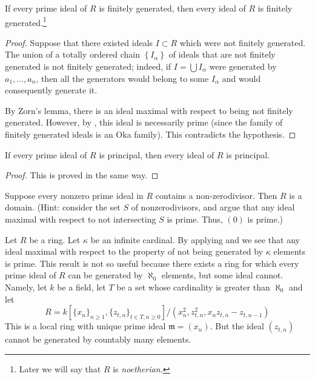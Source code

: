 \begin{corollary}[Cohen] \label{primenoetherian}
If every prime ideal of $R$ is finitely generated, then every ideal of $R$ is
finitely generated.\footnote{Later we will say that $R$ is \emph{noetherian.}} 
\end{corollary} 

\begin{proof} 
Suppose that there existed ideals $I \subset R$ which were not finitely
generated.
The union of a totally ordered chain $\left\{I_\alpha\right\}$ of ideals that
are not finitely generated is not finitely
generated; indeed, if $I = \bigcup I_\alpha$ were generated by $a_1, \dots,
a_n$, then all the generators would belong to some $I_\alpha $ and would
consequently generate it.

By Zorn's lemma, there is an ideal maximal with respect to being not finitely
generated. However, by , this ideal is necessarily
prime (since the family of finitely generated ideals is an Oka family). This contradicts the hypothesis.
\end{proof} 

\begin{corollary} 
If every prime ideal of $R$ is principal, then every ideal of $R$ is principal.
\end{corollary} 
\begin{proof} 
This is proved in the same way.
\end{proof} 

\begin{exercise} 
Suppose every nonzero prime ideal in $R$ contains a non-zerodivisor. Then $R$
is a domain. (Hint: consider the set $S$ of nonzerodivisors, and argue that
any ideal maximal with respect to not intersecting $S$ is prime. Thus, $(0)$
is prime.)
\end{exercise} 


\begin{remark}
\label{remark-cohen-bound-cardinality}
Let $R$ be a ring. Let $\kappa$ be an infinite cardinal.
By applying
 and
we see that any ideal maximal with respect to the property of not being
generated by $\kappa$ elements is prime. This result is not so
useful because there exists a ring for which every prime ideal
of $R$ can be generated by $\aleph_0$ elements, but some
ideal cannot. Namely, let $k$ be a field, let $T$ be a set whose
cardinality is greater than $\aleph_0$ and let
\[ R = k[\{x_n\}_{n \geq 1}, \{z_{t, n}\}_{t \in T, n \geq 0}]/
(x_n^2, z_{t, n}^2, x_n z_{t, n} - z_{t, n - 1}) \]
This is a local ring with unique prime ideal
$\mathfrak m = (x_n)$. But the ideal $(z_{t, n})$ cannot
be generated by countably many elements.
\end{remark}

